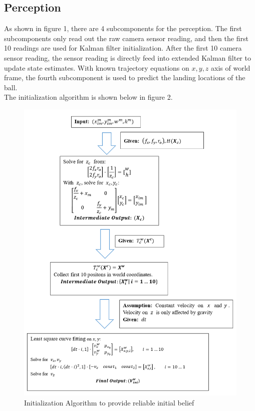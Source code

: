 \documentclass[a4paper]{article}
\begin{document}
\subsection{Perception}
As shown in figure 1, there are 4 subcomponents for the perception. The first subcomponents only read out the raw camera sensor reading, and then the first 10 readings are used for Kalman filter initialization. After the first 10 camera sensor reading, the sensor reading is directly feed into extended Kalman filter to update state estimates. With known trajectory equations on $x,y,z$ axis of world frame, the fourth subcomponent is used to predict the landing locations of the ball. \\
The initialization algorithm is shown below in figure 2.
\begin{figure}[h]
\centering
\includegraphics[scale=1.1]{InitializationAlgo.PNG}
\caption{Initialization Algorithm to provide reliable initial belief}
\end{figure}
\end{document}
